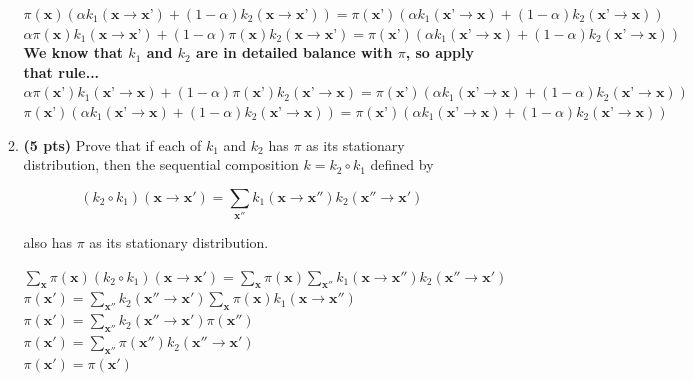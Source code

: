 \documentclass{article}
\begin{document}
\begin{enumerate}
\begin{enumerate}[label=($\alph*$)]
    \color{blue}
        $\pi(\textbf{x})(\alpha k_1(\textbf{x} \rightarrow \textbf{x'}) + (1-\alpha)k_2(\textbf{x} \rightarrow \textbf{x'})) = \pi(\textbf{x'})(\alpha k_1(\textbf{x'} \rightarrow \textbf{x}) + (1-\alpha)k_2(\textbf{x'} \rightarrow \textbf{x}))$\\
        $\alpha \pi(\textbf{x}) k_1(\textbf{x} \rightarrow \textbf{x'}) + (1-\alpha) \pi(\textbf{x}) k_2(\textbf{x} \rightarrow \textbf{x'}) = \pi(\textbf{x'})(\alpha k_1(\textbf{x'} \rightarrow \textbf{x}) + (1-\alpha)k_2(\textbf{x'} \rightarrow \textbf{x}))$\\
        \textbf{We know that $k_1$ and $k_2$ are in detailed balance with $\pi$, so apply that rule...}\\
        $\alpha \pi(\textbf{x'}) k_1(\textbf{x'} \rightarrow \textbf{x}) + (1-\alpha) \pi(\textbf{x'}) k_2(\textbf{x'} \rightarrow \textbf{x}) = \pi(\textbf{x'})(\alpha k_1(\textbf{x'} \rightarrow \textbf{x}) + (1-\alpha)k_2(\textbf{x'} \rightarrow \textbf{x}))$\\
        $\pi(\textbf{x'})(\alpha k_1(\textbf{x'} \rightarrow \textbf{x}) + (1-\alpha) k_2(\textbf{x'} \rightarrow \textbf{x})) = \pi(\textbf{x'})(\alpha k_1(\textbf{x'} \rightarrow \textbf{x}) + (1-\alpha)k_2(\textbf{x'} \rightarrow \textbf{x}))$
    \color{black}



    \item \textbf{(5 pts)} Prove that if each of $k_1$ and $k_2$ has $\pi$ as its stationary distribution, then the sequential composition $k = k_2 \circ k_1$ defined by

    \begin{equation*}
        (k_2 \circ k_1)(\mathbf{x} \rightarrow \mathbf{x'}) = \sum_{\mathbf{x''}} k_1(\mathbf{x} \rightarrow \mathbf{x''})k_2(\mathbf{x''} \rightarrow \mathbf{x'})
    \end{equation*}

    also has $\pi$ as its stationary distribution.

    \color{blue}
        $\sum_{\mathbf{x}}\pi(\mathbf{x})(k_2 \circ k_1)(\mathbf{x} \rightarrow \mathbf{x'}) = \sum_{\mathbf{x}}\pi(\mathbf{x})\sum_{\mathbf{x''}} k_1(\mathbf{x} \rightarrow \mathbf{x''})k_2(\mathbf{x''} \rightarrow \mathbf{x'})$\\
        $\pi(\mathbf{x'}) = \sum_{\mathbf{x''}} k_2(\mathbf{x''} \rightarrow \mathbf{x'}) \sum_{\mathbf{x}}\pi(\mathbf{x}) k_1(\mathbf{x} \rightarrow \mathbf{x''})$\\
        $\pi(\mathbf{x'}) = \sum_{\mathbf{x''}} k_2(\mathbf{x''} \rightarrow \mathbf{x'}) \pi(\mathbf{x''})$\\
        $\pi(\mathbf{x'}) = \sum_{\mathbf{x''}} \pi(\mathbf{x''}) k_2(\mathbf{x''} \rightarrow \mathbf{x'})$\\
        $\pi(\mathbf{x'}) = \pi(\mathbf{x'})$
    \color{black}


\end{enumerate}
\end{enumerate}
\end{document}
